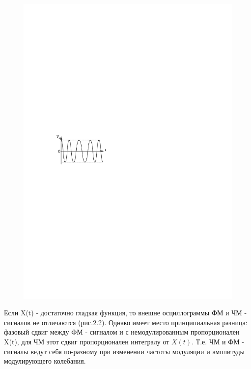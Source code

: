 \begin{figure} 
	\vspace{-2ex}
	\centering
	\includegraphics[scale=1.1]{fig/fig2-2}
	\caption{}
	\label{fig:2.2}
\end{figure}
Если X(t) - достаточно гладкая функция, то внешне осциллограммы ФМ и ЧМ - сигналов не отличаются (рис.2.2). Однако имеет место принципиальная разница: фазовый сдвиг между ФМ - сигналом и с немодулированным пропорционален X(t), для ЧМ этот сдвиг пропорционален интегралу от $X(t)$. Т.е. ЧМ и ФМ - сигналы ведут себя по-разному при изменении частоты модуляции и амплитуды модулирующего колебания.

